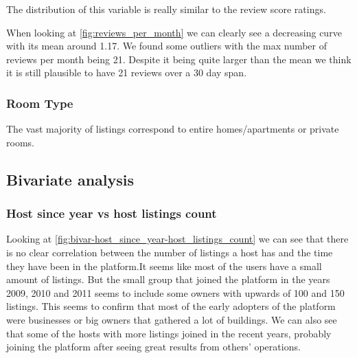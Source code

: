 The distribution of this variable is really similar to the review score ratings.




When looking at \ref{fig:reviews_per_month} we can clearly see a decreasing curve with its mean around 1.17. We found some outliers with the max number of reviews per month being 21. Despite it being quite larger than the mean we think it is still plausible to have 21 reviews over a 30 day span.


\pagebreak
\subsubsection{Room Type}


The vast majority of listings correspond to entire homes/apartments or private rooms.

\pagebreak
\subsection{Bivariate analysis}%
\subsubsection{Host since year vs host listings count}


Looking at \cref{fig:bivar-host_since_year-host_listings_count} we can see that there is no clear correlation between the number of listings a host has and the time they have been in the platform.It seems like most of the users have a small amount of listings. 
But the small group that joined the platform in the years 2009, 2010 and 2011 seems to include some owners with upwards of 100 and 150 listings. This seems to confirm that most of the early adopters of the platform were businesses or big owners that gathered a lot of buildings. We can also see that some of the hosts with more listings joined in the recent years, probably joining the platform after seeing great results from others' operations. 


